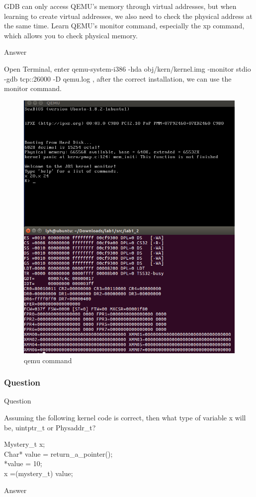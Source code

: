 GDB can only access QEMU's memory through virtual addresses, but when learning to create virtual addresses, we also need to check the physical address at the same time. Learn QEMU's monitor command, especially the xp command, which allows you to check physical memory.

\begin{flushleft}
{\Large Answer}
\end{flushleft}

Open Terminal, enter qemu-system-i386 -hda obj/kern/kernel.img -monitor stdio -gdb tcp::26000 -D qemu.log , after the correct installation, we can use the monitor command.
\begin{figure}[H]
\centering
\includegraphics[width=0.8\linewidth]{figure/qemu_commond}
\caption{qemu command}
\end{figure}

\subsubsection{Question }
\begin{flushleft}
{\Large Question}
\end{flushleft}

Assuming the following kernel code is correct, then what type of variable x will be, uintptr\_t or
Physaddr\_t?
\begin{flushleft}
Mystery\_t x;\\
Char* value = return\_a\_pointer();\\
*value = 10; \\
x =(mystery\_t) value;\\
\end{flushleft}
\begin{flushleft}
{\Large Answer}
\end{flushleft}

